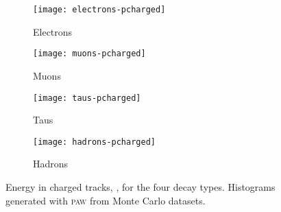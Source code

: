 \begin{figure}[h!]
    \centering
    \begin{subfigure}[c]{0.48\linewidth}
        \centering
        \texttt{[image: electrons-pcharged]}
        \caption{%
            Electrons
        }
        \label{fig:paw-pcharged/electrons}
    \end{subfigure}
    \hfill
    \begin{subfigure}[c]{0.48\linewidth}
        \centering
        \texttt{[image: muons-pcharged]}
        \caption{%
            Muons
        }
        \label{fig:paw-pcharged/muons}
    \end{subfigure}

    \vspace{2ex}

    \begin{subfigure}[c]{0.48\linewidth}
        \centering
        \texttt{[image: taus-pcharged]}
        \caption{%
            Taus
        }
        \label{fig:paw-pcharged/taus}
    \end{subfigure}
    \hfill
    \begin{subfigure}[c]{0.48\linewidth}
        \centering
        \texttt{[image: hadrons-pcharged]}
        \caption{%
            Hadrons
        }
        \label{fig:paw-pcharged/hadrons}
    \end{subfigure}
    \caption{%
        Energy in charged tracks, \pcharged, for the four decay types.
        Histograms generated with \textsc{paw} from Monte Carlo datasets.
    }
    \label{fig:paw-pcharged}
\end{figure}
